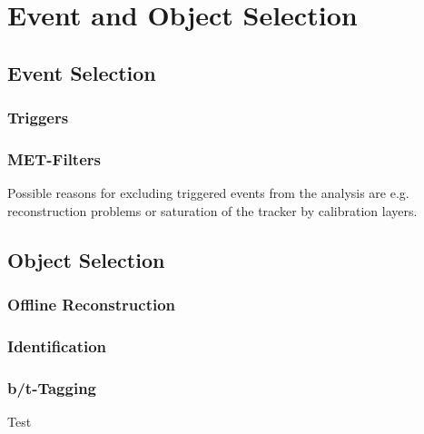 
\chapter{Event and Object Selection}
\label{chap:selection}

\section{Event Selection}
\subsection{Triggers}
\subsection{MET-Filters}
Possible reasons for excluding triggered events from the analysis are e.g. reconstruction problems or saturation of the tracker by calibration layers.


\section{Object Selection}
\subsection{Offline Reconstruction}
\subsection{Identification}
\subsection{b/t-Tagging}
\label{sec:b_tagging}

Test\cite{CMS:CMS-PAS-BTV-15-001}